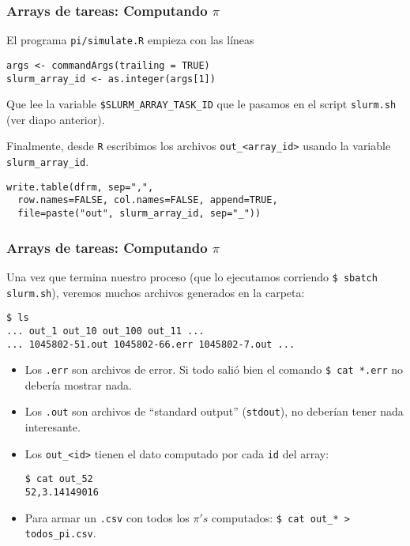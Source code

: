 \documentclass[handout]{beamer}
\begin{document}
\begin{frame}[fragile]
\frametitle{Arrays de tareas: Computando $\pi$}
El programa \Verb=pi/simulate.R= empieza con las líneas
\begin{verbatim}
args <- commandArgs(trailing = TRUE)
slurm_array_id <- as.integer(args[1])
\end{verbatim}
Que lee la variable \Verb=$SLURM_ARRAY_TASK_ID= que le pasamos en el script \Verb=slurm.sh= (ver diapo anterior).

Finalmente, desde \Verb=R= escribimos los archivos \Verb=out_<array_id>= usando la variable \Verb=slurm_array_id=.
\begin{verbatim}
write.table(dfrm, sep=",", 
  row.names=FALSE, col.names=FALSE, append=TRUE, 
  file=paste("out", slurm_array_id, sep="_"))
\end{verbatim}
\end{frame}


\begin{frame}[fragile]
\frametitle{Arrays de tareas: Computando $\pi$}
Una vez que termina nuestro proceso (que lo ejecutamos corriendo \Verb=$ sbatch slurm.sh=), veremos muchos archivos generados en la carpeta:

\begin{verbatim}
$ ls
... out_1 out_10 out_100 out_11 ...
... 1045802-51.out 1045802-66.err 1045802-7.out ...
\end{verbatim}
\begin{itemize}
  \item Los \Verb=.err= son archivos de error. Si todo salió bien el comando \Verb=$ cat *.err= no debería mostrar nada.
  \item Los \Verb=.out= son archivos de ``standard output'' (\Verb=stdout=), no deberían tener nada interesante.
  \item Los \Verb=out_<id>= tienen el dato computado por cada \Verb=id= del array:
  \begin{verbatim}
$ cat out_52
52,3.14149016
  \end{verbatim}
  \item Para armar un \Verb=.csv= con todos los $\pi's$ computados: \Verb=$ cat out_* > todos_pi.csv=.
\end{itemize}
\end{frame}
\end{document}
